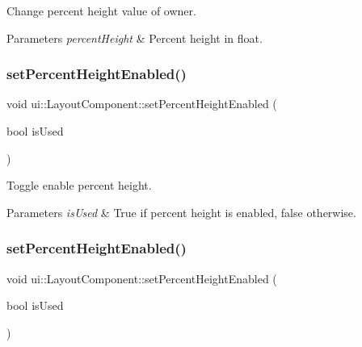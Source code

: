 Change percent height value of owner. 
\begin{DoxyParams}{Parameters}
{\em percent\+Height} & Percent height in float. \\
\hline
\end{DoxyParams}
\mbox{\label{classui_1_1LayoutComponent_aa3554e907c5770808e8ed24abb003996}} 
\subsubsection{\texorpdfstring{set\+Percent\+Height\+Enabled()}{setPercentHeightEnabled()}\hspace{0.1cm}{\footnotesize\ttfamily [1/2]}}
{\footnotesize\ttfamily void ui\+::\+Layout\+Component\+::set\+Percent\+Height\+Enabled (\begin{DoxyParamCaption}\item[{bool}]{is\+Used }\end{DoxyParamCaption})}

Toggle enable percent height. 
\begin{DoxyParams}{Parameters}
{\em is\+Used} & True if percent height is enabled, false otherwise. \\
\hline
\end{DoxyParams}
\mbox{\label{classui_1_1LayoutComponent_aa3554e907c5770808e8ed24abb003996}} 
\subsubsection{\texorpdfstring{set\+Percent\+Height\+Enabled()}{setPercentHeightEnabled()}\hspace{0.1cm}{\footnotesize\ttfamily [2/2]}}
{\footnotesize\ttfamily void ui\+::\+Layout\+Component\+::set\+Percent\+Height\+Enabled (\begin{DoxyParamCaption}\item[{bool}]{is\+Used }\end{DoxyParamCaption})}

